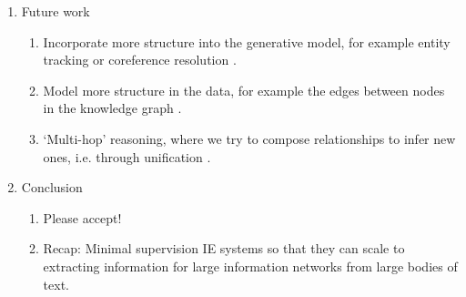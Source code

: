 \documentclass[12pt]{article}
\begin{document}
\begin{enumerate}
\begin{enumerate}
\begin{enumerate}
        \end{enumerate}
    \item Future work
        \begin{enumerate}
        \item Incorporate more structure into the generative model,
            for example entity tracking or coreference resolution \citet{haghighi2010coref}.
        \item Model more structure in the data, for example the edges between nodes
            in the knowledge graph \citet{chen2018diva}.
        \item `Multi-hop' reasoning, where we try to compose relationships to infer new ones,
            i.e. through unification \citet{chen2018diva,rock17prove}.
        \end{enumerate}
    \item Conclusion
        \begin{enumerate}
        \item Please accept!
        \item Recap: Minimal supervision IE systems so that they can scale to
            extracting information for large information networks from large bodies of text.
        \end{enumerate}
    \end{enumerate}
\end{enumerate}

\newpage


\end{document}
